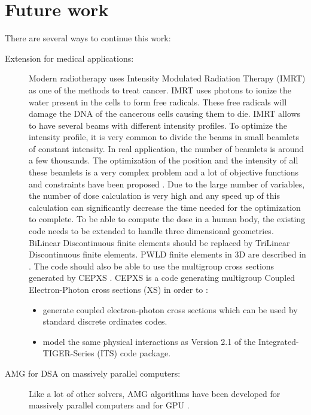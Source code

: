 \section{Future work}
There are several ways to continue this work:
\begin{description}
  \item[Extension for medical applications:] Modern radiotherapy uses Intensity 
    Modulated Radiation Therapy (IMRT) as one of the methods to
    treat cancer. IMRT uses photons to ionize the water present in the cells
    to form free radicals. These free radicals will damage the DNA of the
    cancerous cells causing them to die. IMRT allows to have several beams with 
    different intensity  profiles. To optimize the intensity profile, it is 
    very common to divide the beams in small beamlets of constant intensity. 
    In real application, the number of beamlets is around a few thousands. 
    The optimization of the position and the intensity of all these beamlets
    is a very complex problem and a lot of objective functions and 
    constraints have been proposed \cite{minima,dose-volume,complexity,math}.
    Due to the large number of variables, the number of dose calculation is
    very high and any speed up of this calculation can significantly decrease
    the time needed for the optimization to complete.
    To be able to compute the dose in a human body, the existing code needs 
    to be extended to handle three dimensional geometries. BiLinear 
    Discontinuous finite elements should be replaced by TriLinear Discontinuous 
    finite elements. PWLD finite elements in 3D are described in \cite{pwld_3d}. 
    The code should also be able to use the multigroup cross sections generated by 
    CEPXS \cite{cepxs}. CEPXS is a code generating multigroup Coupled 
    Electron-Photon cross sections (XS) in order to \cite{cepxs}:
    \begin{itemize}
      \item generate coupled electron-photon cross sections which can be used by
        standard discrete ordinates codes.
      \item model the same physical interactions as Version 2.1 of the
        Integrated-TIGER-Series (ITS) code package.
    \end{itemize}
  \item[AMG for DSA on massively parallel computers:] Like a lot of other
    solvers, AMG algorithms have been developed for massively parallel
    computers \cite{amg_multicore,amg_parallel} and for GPU \cite{nvidia}.

\end{description}
